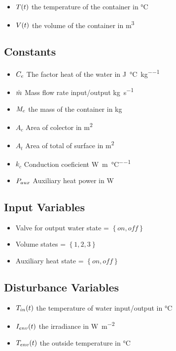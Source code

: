 \begin{itemize}
\item
$T(t)$ the temperature of the container in \si{\degreeCelsius}
\item
$V(t)$ the volume of the container in \si{\metre^3}

\end{itemize}

\subsection{Constants}
\begin{itemize}
\item 
$C_e$ The factor heat of the water in \si{\joule\per\degreeCelsius\per\kilogram}
\item
$\dot{m}$ Mass flow rate input/output  \si{\kilogram\per\second}
\item
$M_{c}$ the mass of the container in \si{\kilogram}
\item
$A_c$ Area of colector in \si{\metre^2}
\item
$A_t$ Area of total of surface in \si{\metre^2}
\item
$k_c$ Conduction coeficient \si{\watt\per\metre\per\degreeCelsius}
\item
$P_{aux}$ Auxiliary heat power in \si{\watt}

\end{itemize}

\subsection{Input Variables}
\begin{itemize}
\item
Valve for output water state = $\left\lbrace on,off \right\rbrace $
\item
Volume states = $\left\lbrace1,2,3\right\rbrace $
\item
Auxiliary heat state = $\left\lbrace on,off \right\rbrace $


\end{itemize}

\subsection{Disturbance Variables}
\begin{itemize}
\item 
$T_{in}(t)$ the temperature of water input/output in \si{\degreeCelsius}
\item
$I_{env}(t)$ the irradiance in \si{\watt\per\square\metre}
\item
$T_{env}(t)$ the outside temperature in \si{\degreeCelsius}
\end{itemize}

